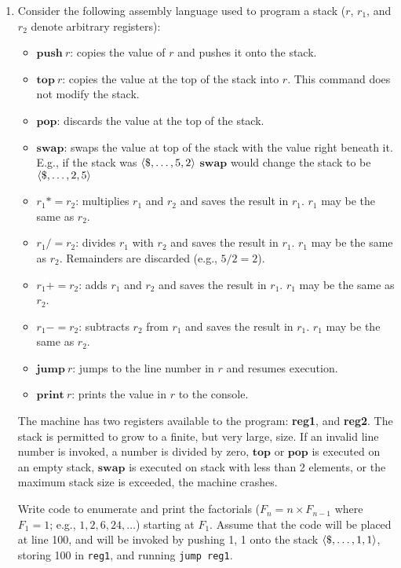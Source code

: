 \documentclass[11pt]{article}
\newcommand{\kw}[1]{\ensuremath{\mathbf{#1}}}
\DeclarePairedDelimiter\angl{\langle}{\rangle}
\begin{document}
\begin{enumerate}
\item Consider the following assembly language used to program a stack ($r$, $r_1$, and $r_2$ denote arbitrary registers):
    \begin{itemize}
        \item $\kw{push}\ r$: copies the value of $r$ and pushes it onto the stack.
        \item $\kw{top}\ r$: copies the value at the top of the stack into $r$. This command does not modify the stack.
        \item $\kw{pop}$: discards the value at the top of the stack.
        \item $\kw{swap}$: swaps the value at top of the stack with the value right beneath it. E.g., if the stack was $\angl{\$,\ldots, 5, 2}$ \kw{swap} would change the stack to be $\angl{\$, \ldots, 2, 5}$
        \item $r_1 \mathbin{{*}{=}} r_2$: multiplies $r_1$ and $r_2$ and saves the result in $r_1$. $r_1$ may be the same as $r_2$.
        \item $r_1 \mathbin{{/}{=}} r_2$: divides $r_1$ with $r_2$ and saves the result in $r_1$. $r_1$ may be the same as $r_2$. Remainders are discarded (e.g., $5 / 2 = 2$).
        \item $r_1 \mathbin{{+}{=}} r_2$: adds $r_1$ and $r_2$ and saves the result in $r_1$. $r_1$ may be the same as $r_2$.
        \item $r_1 \mathbin{{-}{=}} r_2$: subtracts $r_2$ from $r_1$ and saves the result in $r_1$. $r_1$ may be the same as $r_2$.
        \item $\kw{jump}\ r$: jumps to the line number in $r$ and resumes execution.
        \item $\kw{print}\ r$: prints the value in $r$ to the console.
    \end{itemize}
The machine has two registers available to the program: \textbf{reg1}, and \textbf{reg2}. The stack is permitted to grow to a finite, but very large, size. If an invalid line number is invoked, a number is divided by zero, \kw{top} or \kw{pop} is executed on an empty stack, \kw{swap} is executed on stack with less than 2 elements, or the maximum stack size is exceeded, the machine crashes.

\bigskip

Write code to enumerate and print the factorials ($F_n = n \times F_{n-1}$ where $F_1 = 1$; e.g., $1, 2, 6, 24, \ldots$) starting at $F_1$. Assume that the code will be placed at line 100, and will be invoked by pushing 1, 1 onto the stack $\angl{\$, \ldots, 1, 1}$, storing 100 in \lstinline[language=asm]{reg1}, and running \lstinline[language=asm]{jump reg1}.


\end{enumerate}
\end{document}
